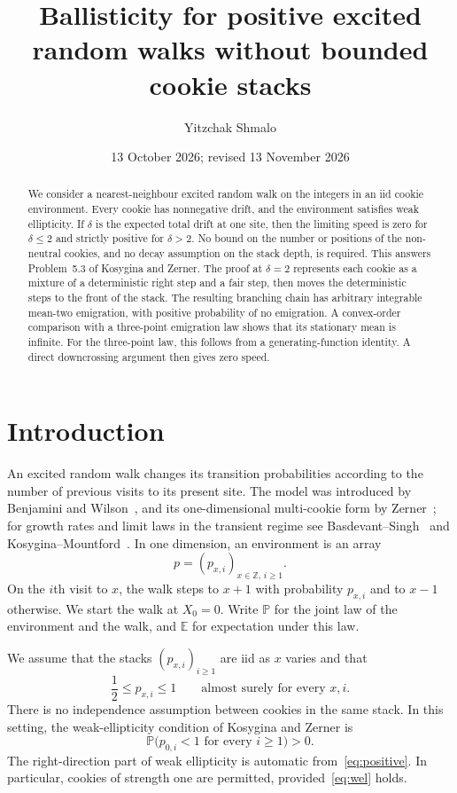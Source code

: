 \documentclass[11pt]{amsart}
\title[Ballisticity without bounded cookie stacks]{Ballisticity for positive excited random walks without bounded cookie stacks}
\author{Yitzchak Shmalo}
\date{13 October 2026; revised 13 November 2026}
\numberwithin{equation}{section}
\theoremstyle{remark}
\newcommand{\E}{\mathbb E}
\newcommand{\Pp}{\mathbb P}
\newcommand{\Z}{\mathbb Z}
\begin{document}
\begin{abstract}
We consider a nearest-neighbour excited random walk on the integers in an iid cookie environment. Every cookie has nonnegative drift, and the environment satisfies weak ellipticity. If $\delta$ is the expected total drift at one site, then the limiting speed is zero for $\delta\le2$ and strictly positive for $\delta>2$. No bound on the number or positions of the non-neutral cookies, and no decay assumption on the stack depth, is required. This answers Problem~5.3 of Kosygina and Zerner. The proof at $\delta=2$ represents each cookie as a mixture of a deterministic right step and a fair step, then moves the deterministic steps to the front of the stack. The resulting branching chain has arbitrary integrable mean-two emigration, with positive probability of no emigration. A convex-order comparison with a three-point emigration law shows that its stationary mean is infinite. For the three-point law, this follows from a generating-function identity. A direct downcrossing argument then gives zero speed.
\end{abstract}
\maketitle

\section{Introduction}\label{sec:intro}

An excited random walk changes its transition probabilities according to the number of previous visits to its present site. The model was introduced by Benjamini and Wilson~\cite{BW03}, and its one-dimensional multi-cookie form by Zerner~\cite{Zerner05}; for growth rates and limit laws in the transient regime see Basdevant--Singh~\cite{BS08b} and Kosygina--Mountford~\cite{KM11}. In one dimension, an environment is an array
\[
 p=(p_{x,i})_{x\in\Z,\,i\ge1}.
\]
On the $i$th visit to $x$, the walk steps to $x+1$ with probability $p_{x,i}$ and to $x-1$ otherwise. We start the walk at $X_0=0$. Write $\Pp$ for the joint law of the environment and the walk, and $\E$ for expectation under this law.

We assume that the stacks $(p_{x,i})_{i\ge1}$ are iid as $x$ varies and that
\begin{equation}\label{eq:positive}
 \frac12\le p_{x,i}\le1\qquad\text{almost surely for every }x,i.
\end{equation}
There is no independence assumption between cookies in the same stack. In this setting, the weak-ellipticity condition of Kosygina and Zerner is
\begin{equation}\label{eq:wel}
 \Pp\bigl(p_{0,i}<1\text{ for every }i\ge1\bigr)>0.
\end{equation}
The right-direction part of weak ellipticity is automatic from~\eqref{eq:positive}. In particular, cookies of strength one are permitted, provided~\eqref{eq:wel} holds.
\end{document}
